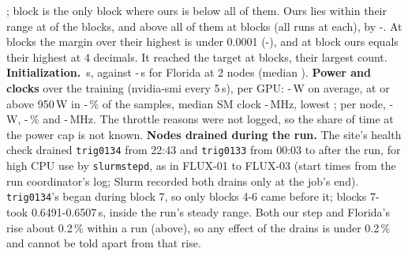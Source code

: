 \TriFxTwoBelowHi; block \TriFxTwoBelow{} is the only block where ours is below all of them. Ours lies within their range at \TriFxTwoInside{} of the \TriFxTwoCompared{} blocks, and above all of them at blocks \TriFxTwoAbove{} (all \TriFxTwoFlRuns{} runs at each), by \TriFxTwoAboveLo-\TriFxTwoAboveHi. At blocks \TriFxTwoClose{} the margin over their highest is under 0.0001 (\TriFxTwoCloseLo-\TriFxTwoCloseHi), and at block \TriFxTwoTie{} ours equals their highest at 4 decimals. It reached the target at \TriFxTwoBlocks{} blocks, their largest count. \textbf{Initialization.} \TriFxTwoInit\,s, against \TriFxTwoFlInitLo-\TriFxTwoFlInitHi\,s for Florida at 2 nodes (median \TriFxTwoFlInitMed). \textbf{Power and clocks} over the training (nvidia-smi every 5\,s), per GPU: \TriFxTwoPowerLo-\TriFxTwoPowerHi\,W on average, at or above 950\,W in \TriFxTwoHotLo-\TriFxTwoHotHi\,\% of the samples, median SM clock \TriFxTwoSmLo-\TriFxTwoSmHi\,MHz, lowest \TriFxTwoSmMin; per node, \TriFxTwoNodePowerLo-\TriFxTwoNodePowerHi\,W, \TriFxTwoNodeHotLo-\TriFxTwoNodeHotHi\,\% and \TriFxTwoNodeSmLo-\TriFxTwoNodeSmHi\,MHz. The throttle reasons were not logged, so the share of time at the power cap is not known. \textbf{Nodes drained during the run.} The site's health check drained \texttt{trig0134} from 22:43 and \texttt{trig0133} from 00:03 to after the run, for high CPU use by \texttt{slurmstepd}, as in FLUX-01 to FLUX-03 (start times from the run coordinator's log; Slurm recorded both drains only at the job's end). \texttt{trig0134}'s began during block 7, so only blocks 4-6 came before it; blocks 7-\TriFxTwoBlocks{} took 0.6491-0.6507\,s, inside the run's steady range. Both our step and Florida's rise about 0.2\,\% within a run (above), so any effect of the drains is under 0.2\,\% and cannot be told apart from that rise.

